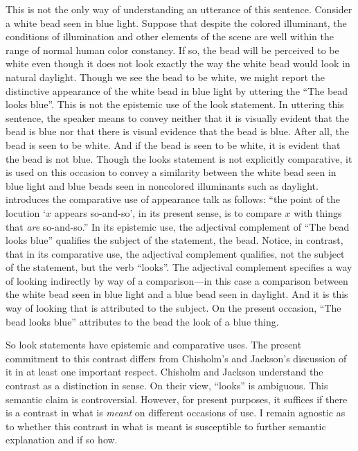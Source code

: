 \documentclass[12pt]{article}
\begin{document}
This is not the only way of understanding an utterance of this sentence. Consider a white bead seen in blue light. Suppose that despite the colored illuminant, the conditions of illumination and other elements of the scene are well within the range of normal human color constancy. If so, the bead will be perceived to be white even though it does not look exactly the way the white bead would look in natural daylight. Though we see the bead to be white, we might report the distinctive appearance of the white bead in blue light by uttering the ``The bead looks blue''. This is not the epistemic use of the look statement. In uttering this sentence, the speaker means to convey neither that it is visually evident that the bead is blue nor that there is visual evidence that the bead is blue. After all, the bead is seen to be white. And if the bead is seen to be white, it is evident that the bead is not blue. Though the looks statement is not explicitly comparative, it is used on this occasion to convey a similarity between the white bead seen in blue light and blue beads seen in noncolored illuminants such as daylight. \citet[45]{Chisholm:1957dq} introduces the comparative use of appearance talk as follows: ``the point of the locution `\( x \) appears so-and-so', in its present sense, is to compare \( x \) with things that \emph{are} so-and-so.'' In its epistemic use, the adjectival complement of ``The bead looks blue'' qualifies the subject of the statement, the bead. Notice, in contrast, that in its comparative use, the adjectival complement qualifies, not the subject of the statement, but the verb ``looks''. The adjectival complement specifies a way of looking indirectly by way of a comparison---in this case a comparison between the white bead seen in blue light and a blue bead seen in daylight. And it is this way of looking that is attributed to the subject. On the present occasion, ``The bead looks blue'' attributes to the bead the look of a blue thing.

So look statements have epistemic and comparative uses. The present commitment to this contrast differs from Chisholm's and Jackson's discussion of it in at least one important respect. Chisholm and Jackson understand the contrast as a distinction in sense. On their view, ``looks'' is ambiguous. This semantic claim is controversial. However, for present purposes, it suffices if there is a contrast in what is \emph{meant} on different occasions of use. I remain agnostic as to whether this contrast in what is meant is susceptible to further semantic explanation and if so how. 
\end{document}
